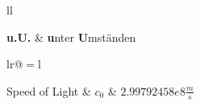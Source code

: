 \documentclass[
10pt, %
twoside, %
chapterinoneline,%
onehalfspacing, %
nolistspacing, %
parskip, %
headsepline, %
english,
]{MastersDoctoralThesis} %
\begin{document}
\begin{abbreviations}{ll} %
	
	
	\textbf{u.U.} & \textbf{u}nter \textbf{U}mständen\\
	
\end{abbreviations}


\begin{constants}{lr@{${}={}$}l} %
	
	
	Speed of Light & $c_{0}$ & $\unit{2.99792458e8}{\frac{m}{s}}$\\

	
\end{constants}


\mainmatter %

\pagestyle{thesis} %



%


\appendix %





\printbibliography[heading=bibintoc]


\end{document}
